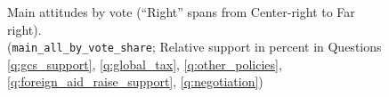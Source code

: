 \begin{figure}[h!] 
    \cprotect\caption[Main attitudes by vote]{Main attitudes by vote (``Right'' spans from Center-right to Far right). \\ (\verb|main_all_by_vote_share|; Relative support in percent in Questions \ref{q:gcs_support}, \ref{q:global_tax}, \ref{q:other_policies}, \ref{q:foreign_aid_raise_support}, \ref{q:negotiation}) %
    }\label{fig:main_by_vote}
\end{figure}




